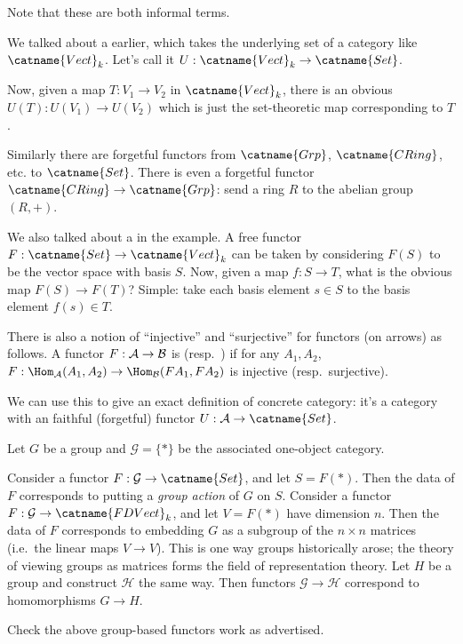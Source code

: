 \begin{example}
	Note that these are both informal terms.
	\begin{enumerate}[(a)]
		\ii We talked about a  earlier,
		which takes the underlying set of a category like $\catname{Vect}_k$.
		Let's call it $U : \catname{Vect}_k \to \catname{Set}$.

		Now, given a map $T : V_1 \to V_2$ in $\catname{Vect}_k$,
		there is an obvious $U(T) : U(V_1) \to U(V_2)$ which is just
		the set-theoretic map corresponding to $T$.

		Similarly there are forgetful functors from $\catname{Grp}$, $\catname{CRing}$,
		etc. to $\catname{Set}$.
		There is even a forgetful functor $\catname{CRing} \to \catname{Grp}$: send a ring $R$
		to the abelian group $(R,+)$.

		\ii We also talked about a  in the example.
		A free functor $F : \catname{Set} \to \catname{Vect}_k$ can be taken by considering
		$F(S)$ to be the vector space with basis $S$.
		Now, given a map $f : S \to T$, what is the obvious map $F(S) \to F(T)$?
		Simple: take each basis element $s \in S$ to the basis element $f(s) \in T$.
	\end{enumerate}
\end{example}
\begin{remark}
	There is also a notion of ``injective'' and ``surjective'' for functors (on arrows) as follows.
	A functor $F : \mathcal A \to \mathcal B$ is  (resp.\ ) if for any $A_1, A_2$,
	$F : \Hom_\AA(A_1, A_2) \to \Hom_\BB(FA_1, FA_2)$ is injective (resp.\ surjective).

	We can use this to give an exact definition of concrete category:
	it's a category with an faithful (forgetful) functor $U: \AA \to \catname{Set}$.
\end{remark}

\begin{example}
	Let $G$ be a group and $\mathcal G = \{\ast\}$ be the associated one-object category.
	\begin{enumerate}[(a)]
		\ii Consider a functor $F : \mathcal G \to \catname{Set}$, and let $S = F(\ast)$.
		Then the data of $F$ corresponds to putting a \emph{group action} of $G$ on $S$.
		\ii Consider a functor $F : \mathcal G \to \catname{FDVect}_k$, and let $V = F(\ast)$ have dimension $n$.
		Then the data of $F$ corresponds to embedding $G$ as a subgroup of the $n \times n$ matrices
		(i.e.\ the linear maps $V \to V$).
		This is one way groups historically arose; the theory of viewing groups as matrices
		forms the field of representation theory.
		\ii Let $H$ be a group and construct $\mathcal H$ the same way.
		Then functors $\mathcal G \to \mathcal H$ correspond to homomorphisms $G \to H$.
	\end{enumerate}
\end{example}
\begin{exercise}
	Check the above group-based functors work as advertised.
\end{exercise}

